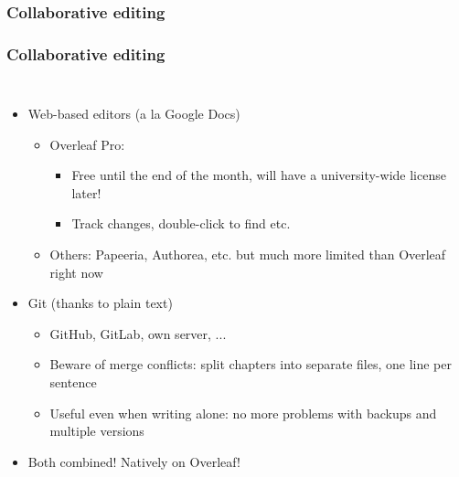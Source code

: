 \documentclass[xetex,colorlinks]{beamer} %
\begin{document}
  \subsubsection{Collaborative editing}
  \begin{frame}
    \frametitle{Collaborative editing}
    \begin{columns}
      \begin{itemize}
	\item Web-based editors (a la Google Docs)
	\begin{itemize}
	  \item Overleaf Pro:
	  \begin{itemize}
	    \item Free until the end of the month, will have a university-wide license later!
	    \item Track changes, double-click to find etc.
	  \end{itemize}
	  \item Others: Papeeria, Authorea, etc. but much more limited than Overleaf right now
	\end{itemize}
	\item Git (thanks to plain text)
	\begin{itemize}
	  \item GitHub, GitLab, own server, ...
	  \item Beware of merge conflicts: split chapters into separate files, one line per sentence
	  \item Useful even when writing alone: no more problems with backups and multiple versions
	\end{itemize}
	\item Both combined! Natively on Overleaf!
      \end{itemize}
      
    \end{columns}
  \end{frame}
  
\end{document}
